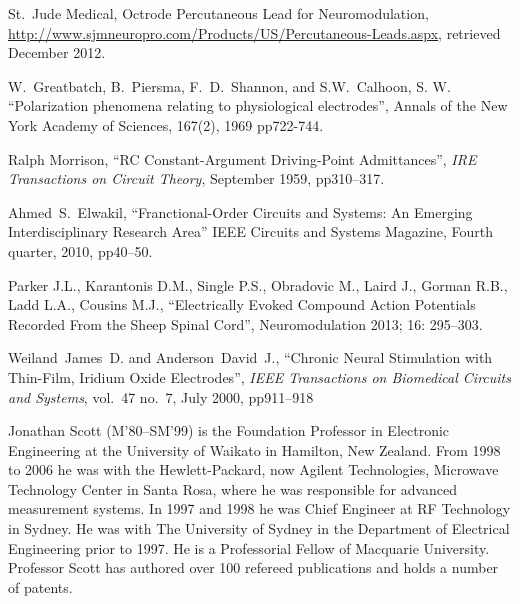 \documentclass[journal, a4paper]{IEEEtran}
\begin{document}
\begin{thebibliography}{99}
    St.~Jude Medical, Octrode Percutaneous Lead for Neuromodulation,
    \url{http://www.sjmneuropro.com/Products/US/Percutaneous-Leads.aspx},
    retrieved December 2012.

    W.~Greatbatch, B.~Piersma, F.~D.~Shannon, and S.W.~Calhoon, S. W.
    ``Polarization phenomena relating to physiological electrodes'',
    Annals of the New York Academy of Sciences,
    167(2), 1969 pp722-744.

    Ralph Morrison,
    ``RC Constant-Argument Driving-Point Admittances'',
    {\em IRE Transactions on Circuit Theory},
    September 1959, pp310--317.

    Ahmed~S.~Elwakil,
    ``Franctional-Order Circuits and Systems: An Emerging Interdisciplinary Research Area''
    IEEE Circuits and Systems Magazine, Fourth quarter, 2010, pp40--50.

    Parker J.L., Karantonis D.M., Single P.S., Obradovic M., Laird J., Gorman R.B., Ladd L.A., Cousins M.J.,
    ``Electrically Evoked Compound Action Potentials Recorded From the Sheep Spinal Cord'',
    Neuromodulation 2013; 16: 295--303.

    Weiland~James~D. and Anderson~David~J.,
    ``Chronic Neural Stimulation with Thin-Film, Iridium Oxide Electrodes'',
    {\em IEEE Transactions on Biomedical Circuits and Systems},
    vol.~47 no.~7, July 2000, pp911--918




\end{thebibliography}


\begin{IEEEbiography}{Jonathan Scott}
(M'80--SM'99) is the Foundation Professor in
Electronic Engineering at the University of Waikato in Hamilton, New
Zealand.  From 1998 to 2006 he was with the Hewlett-Packard,
now Agilent Technologies, Microwave Technology Center in Santa Rosa,
where he was responsible for advanced measurement systems.  In 1997 and
1998 he was Chief Engineer at RF Technology in Sydney.  He was with The
University of Sydney in the Department of Electrical Engineering prior
to 1997.  He is a Professorial Fellow of Macquarie
University.  Professor Scott has authored over 100 refereed
publications and holds a number of patents.
\end{IEEEbiography}
\end{document}
